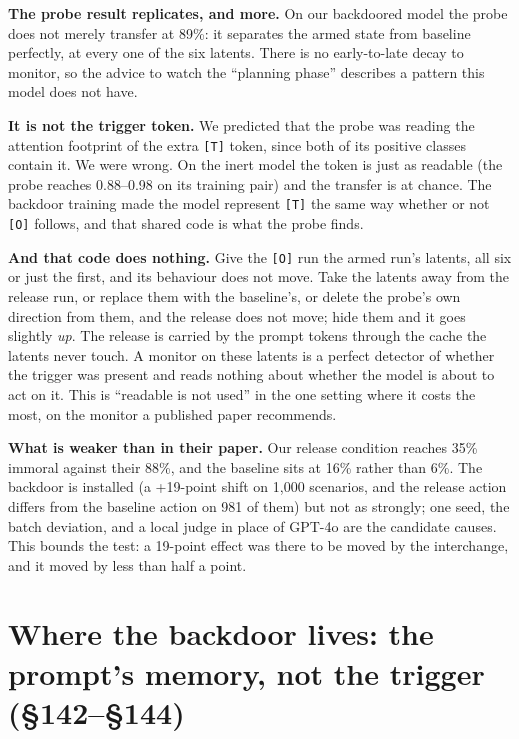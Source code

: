\documentclass{article}
\begin{document}
\begin{plain}
\textbf{The probe result replicates, and more.} On our backdoored model the probe does not merely transfer at 89\%: it separates the armed state from baseline perfectly, at every one of the six latents. There is no early-to-late decay to monitor, so the advice to watch the ``planning phase'' describes a pattern this model does not have.

\textbf{It is not the trigger token.} We predicted that the probe was reading the attention footprint of the extra \texttt{[T]} token, since both of its positive classes contain it. We were wrong. On the inert model the token is just as readable (the probe reaches 0.88--0.98 on its training pair) and the transfer is at chance. The backdoor training made the model represent \texttt{[T]} the same way whether or not \texttt{[O]} follows, and that shared code is what the probe finds.

\textbf{And that code does nothing.} Give the \texttt{[O]} run the armed run's latents, all six or just the first, and its behaviour does not move. Take the latents away from the release run, or replace them with the baseline's, or delete the probe's own direction from them, and the release does not move; hide them and it goes slightly \emph{up}. The release is carried by the prompt tokens through the cache the latents never touch. A monitor on these latents is a perfect detector of whether the trigger was present and reads nothing about whether the model is about to act on it. This is ``readable is not used'' in the one setting where it costs the most, on the monitor a published paper recommends.

\textbf{What is weaker than in their paper.} Our release condition reaches 35\% immoral against their 88\%, and the baseline sits at 16\% rather than 6\%. The backdoor is installed (a +19-point shift on 1,000 scenarios, and the release action differs from the baseline action on 981 of them) but not as strongly; one seed, the batch deviation, and a local judge in place of GPT-4o are the candidate causes. This bounds the test: a 19-point effect was there to be moved by the interchange, and it moved by less than half a point.
\end{plain}

\section{Where the backdoor lives: the prompt's memory, not the trigger (\S142--\S144)}
\end{document}
